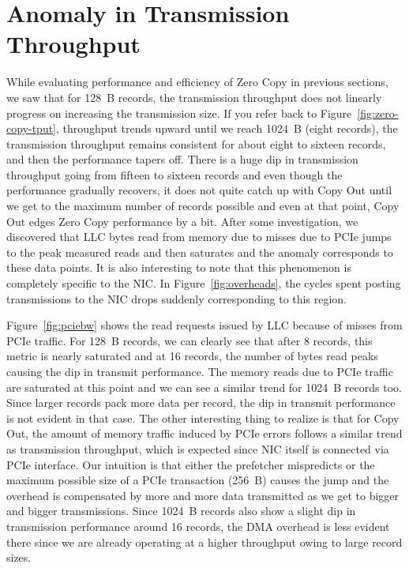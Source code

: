 \section{Anomaly in Transmission Throughput}
\label{sec:anomaly}
While evaluating performance and efficiency of Zero Copy in previous sections, we saw that for 128~B records, the transmission throughput does not linearly progress 
on increasing the transmission size. If you refer back to Figure~\ref{fig:zero-copy-tput}, throughput trends upward until we reach 1024~B (eight records), the transmission throughput remains consistent for about eight to sixteen records, and 
then the performance tapers off. There is a huge dip in transmission throughput going from fifteen to sixteen records and even though the performance gradually recovers, it does not quite 
catch up with Copy Out until we get to the maximum number of records possible and even at that point, Copy Out edges Zero Copy performance by a bit. After some investigation, we discovered 
that LLC bytes read from memory due to misses due to PCIe jumps to the peak measured reads and then saturates and the anomaly corresponds to these data points. It is also interesting to note 
that this phenomenon is completely specific to the NIC. In Figure~\ref{fig:overheads}, the cycles spent posting transmissions to the NIC drops suddenly corresponding to this region.

Figure~\ref{fig:pciebw} shows the read requests issued by LLC because of misses from PCIe traffic. For 128~B records, we can clearly see that after 8 records, this metric is 
nearly saturated and at 16 records, the number of bytes read peaks causing the dip in transmit performance. The memory reads due to PCIe traffic are saturated at this point and 
we can see a similar trend for 1024~B records too. Since larger records pack more data per record, the dip in transmit performance is not evident in that case. The other interesting 
thing to realize is that for Copy Out, the amount of memory traffic induced by PCIe errors follows a similar trend as transmission throughput, which is expected since 
NIC itself is connected via PCIe interface. Our intuition is that either the prefetcher mispredicts or the maximum possible size of a PCIe transaction (256~B) causes the jump 
and the overhead is compensated by more and more data transmitted as we get to bigger and bigger transmissions. Since 1024~B records also show a slight dip in transmission performance 
around 16 records, the DMA overhead is less evident there since we are already operating at a higher throughput owing to large record sizes.


